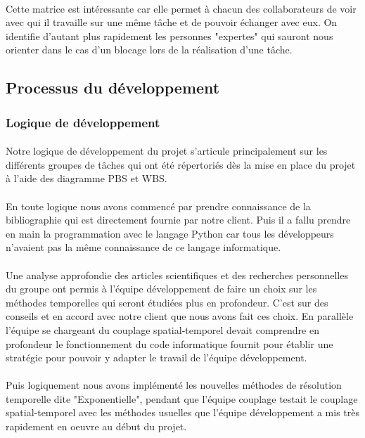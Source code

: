     \paragraph{}
    Cette matrice est intéressante car elle permet à chacun des collaborateurs de voir avec qui il travaille sur une même tâche et de pouvoir échanger avec eux. On identifie d'autant plus rapidement les personnes "expertes" qui sauront nous orienter dans le cas d'un blocage lors de la réalisation d'une tâche. 
 
\newpage    
\subsection{Processus du développement}
    
    \subsubsection{Logique de développement}
    \paragraph{}
    Notre logique de développement du projet s'articule principalement sur les différents groupes de tâches qui ont été répertoriés dès la mise en place du projet à l'aide des diagramme PBS et WBS.
    \paragraph{}
    En toute logique nous avons commencé par prendre connaissance de la bibliographie qui est directement fournie par notre client. Puis il a fallu prendre en main la programmation avec le langage Python car tous les développeurs n'avaient pas la même connaissance de ce langage informatique.
    \paragraph{}
    Une analyse approfondie des articles scientifiques et des recherches personnelles du groupe ont permis à l'équipe développement de faire un choix sur les méthodes temporelles qui seront étudiées plus en profondeur. C'est sur des conseils et en accord avec notre client que nous avons fait ces choix. En parallèle l'équipe se chargeant du couplage spatial-temporel devait comprendre en profondeur le fonctionnement du code informatique fournit pour établir une stratégie pour pouvoir y adapter le travail de l'équipe développement.
    \paragraph{}
    Puis logiquement nous avons implémenté les nouvelles méthodes de résolution temporelle dite "Exponentielle", pendant que l'équipe couplage testait le couplage spatial-temporel avec les méthodes usuelles que l'équipe développement a mis très rapidement en oeuvre au début du projet.
